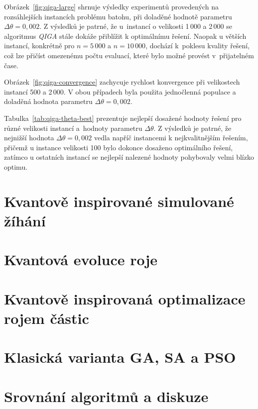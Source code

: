 Obrázek~\ref{fig:qiga-large} shrnuje výsledky experimentů provedených na rozsáhlejších instancích problému batohu, při doladěné hodnotě parametru $\Delta\theta = 0,002$. 
Z výsledků je patrné, že u~instancí o velikosti 1\,000 a 2\,000 se algoritmus \emph{QIGA} stále dokáže přiblížit k optimálnímu řešení. 
Naopak u větších instancí, konkrétně pro $n=5\,000$ a $n=10\,000$, dochází k~poklesu kvality řešení, což lze přičíst omezenému počtu evaluací, které bylo možné provést v~přijatelném čase. 

Obrázek~\ref{fig:qiga-convergence} zachycuje rychlost konvergence při velikostech instancí 500 a 2\,000. 
V obou případech byla použita jednočlenná populace a doladěná hodnota parametru $\Delta\theta = 0,002$.

Tabulka~\ref{tab:qiga-theta-best} prezentuje nejlepší dosažené hodnoty řešení pro různé velikosti instancí a~hodnoty parametru $\Delta\theta$. 
Z výsledků je patrné, že nejnižší hodnota $\Delta\theta = 0,002$ vedla napříč instancemi k nejkvalitnějším řešením, přičemž u instance velikosti 100 bylo dokonce dosaženo optimálního řešení, zatímco u ostatních instancí se nejlepší nalezené hodnoty pohybovaly velmi blízko optimu. 

\section{Kvantově inspirované simulované žíhání}\label{sec:exp-qiga}
\section{Kvantová evoluce roje}\label{sec:exp-qse}
\section{Kvantově inspirovaná optimalizace rojem částic}\label{sec:exp-qipso}
\section{Klasická varianta GA, SA a PSO}\label{sec:exp-ea}
\section{Srovnání algoritmů a diskuze}